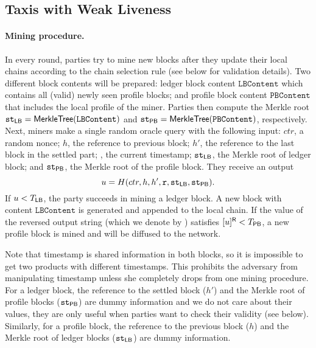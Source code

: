 \subsection{Taxis with Weak Liveness}
\label{subsec:taxis-weak-liveness}

\paragraph{Mining procedure.}
%
In every round, parties try to mine new blocks after they update their local chains according to the chain selection rule (see below for validation details).
%
Two different block contents will be prepared: ledger block content $\mathtt{LBContent}$ which contains all (valid) newly seen profile blocks; and profile block content $\mathtt{PBContent}$ that includes the local profile of the miner.
%
Parties then compute the Merkle root $\mathtt{st}_{\mathsf{LB}} = \mathsf{MerkleTree}(\mathtt{LBContent})$ and $\mathtt{st}_{\mathsf{PB}} = \mathsf{MerkleTree}(\mathtt{PBContent})$, respectively.
%
Next, miners make a single random oracle query with the following input: $ctr$, a random nonce; $h$, the reference to previous block; $h'$, the reference to the last block in the settled part; \round, the current timestamp; $\mathtt{st}_{\mathsf{LB}}$, the Merkle root of ledger block; and $\mathtt{st}_{\mathsf{PB}}$, the Merkle root of the profile block.
%
They receive an output
%
\[ u = H(ctr, h, h', \mathtt{r}, \mathtt{st}_{\mathsf{LB}}, \mathtt{st}_{\mathsf{PB}}). \]
%
If $u < T_\mathsf{LB}$, the party succeeds in mining a ledger block.
%
A new block \LB with content $\mathtt{LBContent}$ is generated and appended to the local chain.
%
If the value of the reversed output string (which we denote by ) satisfies $[u]^{\mathsf{R}} < T_\mathsf{PB}$, a new profile block \PB is mined and will be diffused to the network.

Note that timestamp \round is shared information in both blocks, so it is impossible to get two products with different timestamps.
%
This prohibits the adversary from manipulating timestamp unless she completely drops from one mining procedure.
%
For a ledger block, the reference to the settled block ($h'$) and the Merkle root of profile blocks ($\mathtt{st}_{\mathsf{PB}}$) are dummy information and we do not care about their values, they are only useful when parties want to check their validity (see below).
%
Similarly, for a profile block, the reference to the previous block ($h$) and the Merkle root of ledger blocks ($\mathtt{st}_{\mathsf{LB}}$) are dummy information.

